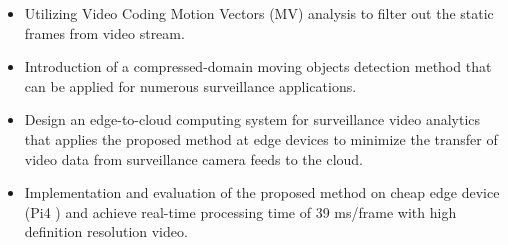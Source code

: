 \begin{itemize}
\item Utilizing Video Coding Motion Vectors (MV) analysis to filter out the static frames from video stream.
\item Introduction of a compressed-domain moving objects detection method that can be applied for numerous surveillance applications.
\item Design an edge-to-cloud computing system for surveillance video analytics that applies the proposed method at edge devices to minimize the transfer of video data from surveillance camera feeds to the cloud.
\item Implementation and evaluation of the proposed method on cheap edge device (Pi4 ) and achieve real-time processing time of  39 ms/frame with high definition resolution video.
\end{itemize}
%
%